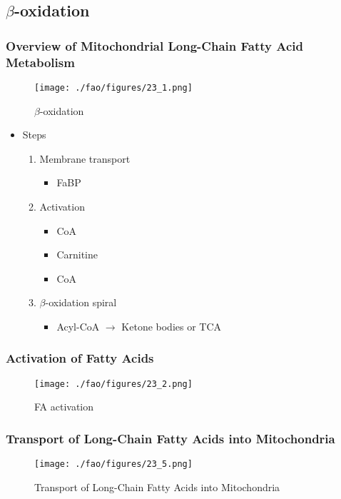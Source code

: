 \documentclass{scrartcl}
\begin{document}
\subsection{\(\beta\)-oxidation}
\label{sec:org2bbe4ec}
\subsubsection{Overview of Mitochondrial Long-Chain Fatty Acid Metabolism}
\label{sec:org31d0ff9}

\begin{figure}[htbp]
\centering
\texttt{[image: ./fao/figures/23\_1.png]}
\caption{\label{fig:orga1d6e6b}
\(\beta\)-oxidation}
\end{figure}

\begin{itemize}
\item Steps 
\begin{enumerate}
\item Membrane transport
\begin{itemize}
\item FaBP
\end{itemize}
\item Activation
\begin{itemize}
\item CoA
\item Carnitine
\item CoA
\end{itemize}
\item \(\beta\)-oxidation spiral
\begin{itemize}
\item Acyl-CoA \(\to\) Ketone bodies or TCA
\end{itemize}
\end{enumerate}
\end{itemize}

\subsubsection{Activation of Fatty Acids}
\label{sec:orgebc66c4}
\begin{figure}[htbp]
\centering
\texttt{[image: ./fao/figures/23\_2.png]}
\caption{\label{fig:orgcc91d51}
FA activation}
\end{figure}

\subsubsection{Transport of Long-Chain Fatty Acids into Mitochondria}
\label{sec:org1a18011}
\begin{figure}[htbp]
\centering
\texttt{[image: ./fao/figures/23\_5.png]}
\caption{\label{fig:orgd7afa47}
Transport of Long-Chain Fatty Acids into Mitochondria}
\end{figure}
\end{document}
